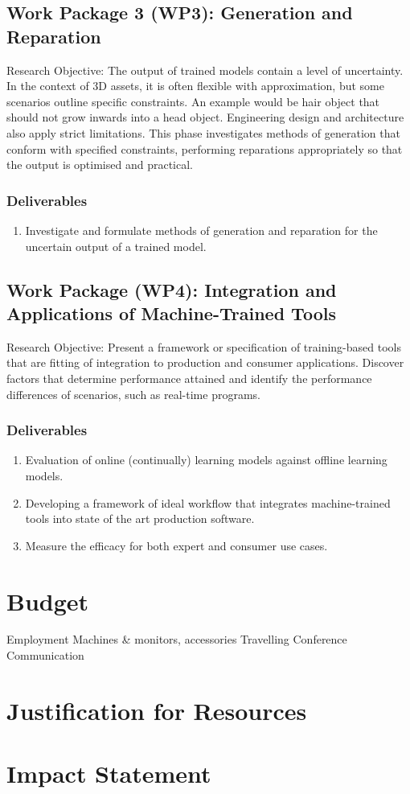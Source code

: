 \documentclass[a4paper, fontsize=15pt, onecolumn]{article} %
\numberwithin{equation}{section} %
\numberwithin{figure}{section} %
\numberwithin{table}{section} %
\begin{document}
\subsection{Work Package 3 (WP3): Generation and Reparation}

Research Objective: The output of trained models contain a level of uncertainty. In the context of 3D assets, it is often flexible with approximation, but some scenarios outline specific constraints. An example would be hair object that should not grow inwards into a head object. Engineering design and architecture also apply strict limitations. This phase investigates methods of generation that conform with specified constraints, performing reparations appropriately so that the output is optimised and practical.

\subsubsection{Deliverables}
\begin{enumerate}
	\item Investigate and formulate methods of generation and reparation for the uncertain output of a trained model.
\end{enumerate}

\subsection{Work Package (WP4): Integration and Applications of Machine-Trained Tools}
Research Objective: Present a framework or specification of training-based tools that are fitting of integration to production and consumer applications. Discover factors that determine performance attained and identify the performance differences of scenarios, such as real-time programs.

\subsubsection{Deliverables}
\begin{enumerate}
	\item Evaluation of online (continually) learning models against offline learning models.
	\item Developing a framework of ideal workflow that integrates machine-trained tools into state of the art production software.
	\item Measure the efficacy for both expert and consumer use cases.
\end{enumerate}
	


\section*{Budget}
Employment
Machines \& monitors, accessories
Travelling
Conference
Communication

\section*{Justification for Resources}

\section*{Impact Statement}
\end{document}
